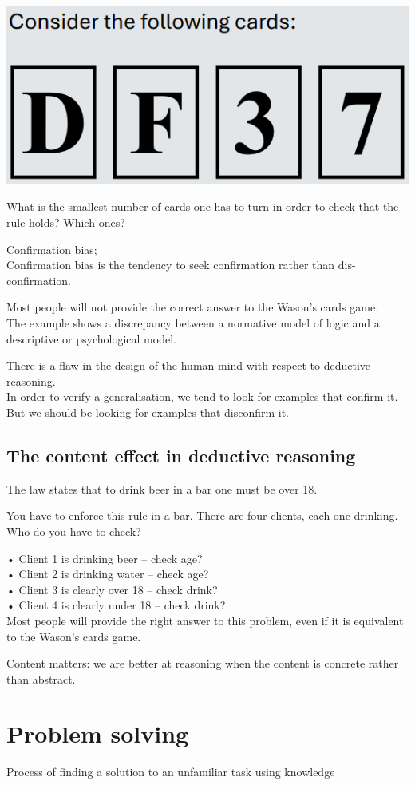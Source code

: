 \documentclass[]{project_plan}
\begin{document}
\includegraphics[width=0.7\linewidth]{Wason_cards.png}

What is the smallest number of cards one has to turn in order to check that the rule holds? Which ones?

Confirmation bias;\\
Confirmation bias is the tendency to seek confirmation rather than dis-confirmation.

Most people will not provide the correct answer to the Wason's cards game.\\
The example shows a discrepancy between a normative model of logic and a descriptive or psychological model.

There is a flaw in the design of the human mind with respect to deductive reasoning.\\
In order to verify a generalisation, we tend to look for examples that confirm it.\\
But we should be looking for examples that disconfirm it.

\subsection{The content effect in deductive reasoning}
The law states that to drink beer in a bar one must be over 18.

You have to enforce this rule in a bar. There are four clients, each one drinking. Who do you have to check?

• Client 1 is drinking beer – check age?\\
• Client 2 is drinking water – check age?\\
• Client 3 is clearly over 18 – check drink?\\
• Client 4 is clearly under 18 – check drink?\\
Most people will provide the right answer to this problem, even if it is equivalent to the Wason's cards
game.

Content matters: we are better at reasoning when the content is concrete rather than abstract.

\section{Problem solving}
Process of finding a solution to an unfamiliar task using knowledge
\end{document}
